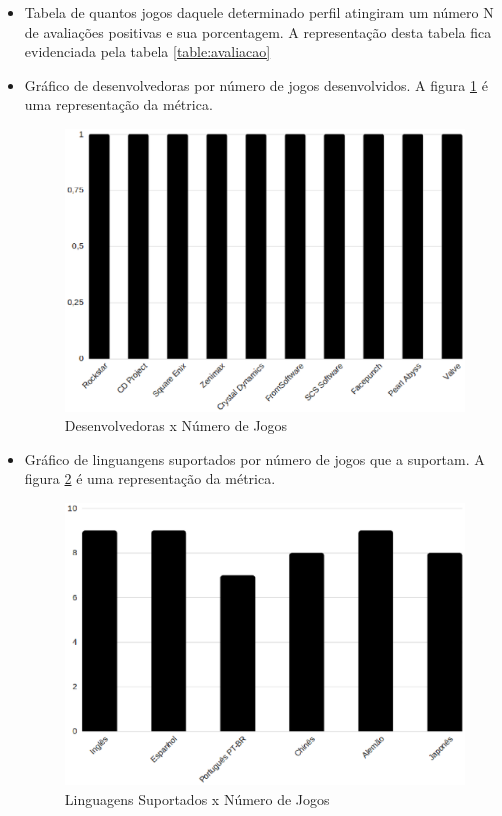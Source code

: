 \begin{itemize}
	\item Tabela de quantos jogos daquele determinado perfil atingiram um número N de avaliações positivas e sua porcentagem. A representação desta tabela fica evidenciada pela tabela \ref{table:avaliacao}
	\item Gráfico de desenvolvedoras por número de jogos desenvolvidos. A figura \ref{image:developers} é uma representação da métrica.
	\begin{figure}
	\centering
	\includegraphics[scale=0.4]{figuras/developer.eps}
	\caption{Desenvolvedoras x Número de Jogos}
	\label{image:developers}
	\end{figure}
	\item Gráfico de linguangens suportados por número de jogos que a suportam. A figura \ref{image:languages} é uma representação da métrica.
	\begin{figure}
	\centering
	\includegraphics[scale=0.4]{figuras/language.eps}
	\caption{Linguagens Suportados x Número de Jogos}
	\label{image:languages}
	\end{figure}
\end{itemize}
